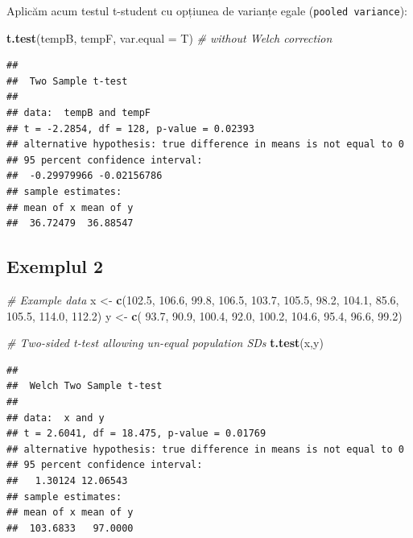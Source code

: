 \documentclass[]{article}
\newenvironment{Shaded}{\begin{snugshade}}{\end{snugshade}}
\newcommand{\KeywordTok}[1]{\textcolor[rgb]{0.13,0.29,0.53}{\textbf{{#1}}}}
\newcommand{\DataTypeTok}[1]{\textcolor[rgb]{0.13,0.29,0.53}{{#1}}}
\newcommand{\FloatTok}[1]{\textcolor[rgb]{0.00,0.00,0.81}{{#1}}}
\newcommand{\StringTok}[1]{\textcolor[rgb]{0.31,0.60,0.02}{{#1}}}
\newcommand{\CommentTok}[1]{\textcolor[rgb]{0.56,0.35,0.01}{\textit{{#1}}}}
\newcommand{\NormalTok}[1]{{#1}}
\begin{document}
Aplicăm acum testul t-student cu opțiunea de varianțe egale
(\texttt{pooled\ variance}):

\begin{Shaded}
\begin{Highlighting}[]
\KeywordTok{t.test}\NormalTok{(tempB, tempF, }\DataTypeTok{var.equal =} \NormalTok{T) }\CommentTok{# without Welch correction }
\end{Highlighting}
\end{Shaded}

\begin{verbatim}
## 
##  Two Sample t-test
## 
## data:  tempB and tempF
## t = -2.2854, df = 128, p-value = 0.02393
## alternative hypothesis: true difference in means is not equal to 0
## 95 percent confidence interval:
##  -0.29979966 -0.02156786
## sample estimates:
## mean of x mean of y 
##  36.72479  36.88547
\end{verbatim}

\subsection{Exemplul 2}\label{exemplul-2}

\begin{Shaded}
\begin{Highlighting}[]
\CommentTok{# Example data}
\NormalTok{x <-}\StringTok{ }\KeywordTok{c}\NormalTok{(}\FloatTok{102.5}\NormalTok{, }\FloatTok{106.6}\NormalTok{,  }\FloatTok{99.8}\NormalTok{, }\FloatTok{106.5}\NormalTok{, }\FloatTok{103.7}\NormalTok{, }\FloatTok{105.5}\NormalTok{, }\FloatTok{98.2}\NormalTok{, }\FloatTok{104.1}\NormalTok{,  }\FloatTok{85.6}\NormalTok{, }\FloatTok{105.5}\NormalTok{, }\FloatTok{114.0}\NormalTok{, }\FloatTok{112.2}\NormalTok{)}
\NormalTok{y <-}\StringTok{ }\KeywordTok{c}\NormalTok{( }\FloatTok{93.7}\NormalTok{,  }\FloatTok{90.9}\NormalTok{, }\FloatTok{100.4}\NormalTok{,  }\FloatTok{92.0}\NormalTok{, }\FloatTok{100.2}\NormalTok{, }\FloatTok{104.6}\NormalTok{, }\FloatTok{95.4}\NormalTok{,  }\FloatTok{96.6}\NormalTok{,  }\FloatTok{99.2}\NormalTok{)}

\CommentTok{# Two-sided t-test allowing un-equal population SDs}
\KeywordTok{t.test}\NormalTok{(x,y)}
\end{Highlighting}
\end{Shaded}

\begin{verbatim}
## 
##  Welch Two Sample t-test
## 
## data:  x and y
## t = 2.6041, df = 18.475, p-value = 0.01769
## alternative hypothesis: true difference in means is not equal to 0
## 95 percent confidence interval:
##   1.30124 12.06543
## sample estimates:
## mean of x mean of y 
##  103.6833   97.0000
\end{verbatim}
\end{document}

